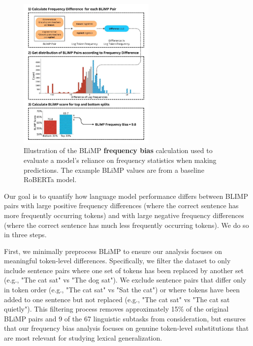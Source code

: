 \begin{figure}
    \centering
    \includegraphics[width=0.6\textwidth]{chapters/syntatic-smoothing/figures/blimp_bias_example.pdf}
    \caption{Illustration of the BLiMP \textbf{frequency bias} calculation used to evaluate a model's reliance on frequency statistics when making predictions. The example BLiMP values are from a baseline RoBERTa model.}
    \label{fig:blimp_bias}
    \vspace{-1em}
\end{figure}

Our goal is to quantify how language model performance differs between BLIMP pairs with large positive frequency differences (where the correct sentence has more frequently occurring tokens) and with large negative frequency differences (where the correct sentence has much less frequently occurring tokens). We do so in three steps.

First, we minimally preprocess BLiMP to ensure our analysis focuses on meaningful token-level differences. Specifically, we filter the dataset to only include sentence pairs where one set of tokens has been replaced by another set (e.g., "The cat sat" vs "The dog sat"). We exclude sentence pairs that differ only in token order (e.g., "The cat sat" vs "Sat the cat") or where tokens have been added to one sentence but not replaced (e.g., "The cat sat" vs "The cat sat quietly"). This filtering process removes approximately 15\% of the original BLiMP pairs and 9 of the 67 linguistic subtasks from consideration, but ensures that our frequency bias analysis focuses on genuine token-level substitutions that are most relevant for studying lexical generalization.

